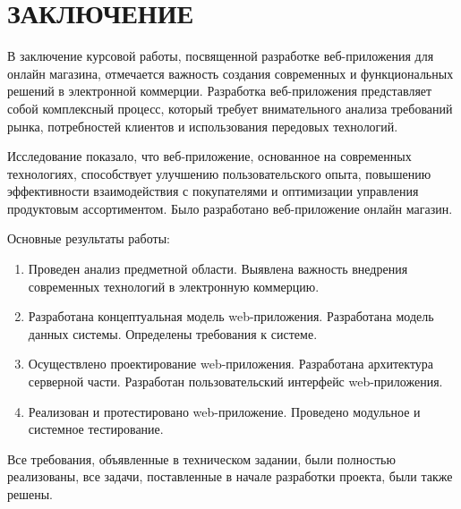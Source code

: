 \section*{ЗАКЛЮЧЕНИЕ}

В заключение курсовой работы, посвященной разработке веб-приложения для онлайн магазина, отмечается важность создания современных и функциональных решений в электронной коммерции. Разработка веб-приложения представляет собой комплексный процесс, который требует внимательного анализа требований рынка, потребностей клиентов и использования передовых технологий.
  
Исследование показало, что веб-приложение, основанное на современных технологиях, способствует улучшению пользовательского опыта, повышению эффективности взаимодействия с покупателями и оптимизации управления продуктовым ассортиментом.
Было разработано веб-приложение онлайн магазин.

Основные результаты работы:

\begin{enumerate}
\item Проведен анализ предметной области. Выявлена важность внедрения современных технологий в электронную коммерцию.
\item Разработана концептуальная модель web-приложения. Разработана модель данных системы. Определены требования к системе.
\item Осуществлено проектирование web-приложения. Разработана архитектура серверной части. Разработан пользовательский интерфейс web-приложения.
\item Реализован и протестировано web-приложение. Проведено модульное и системное тестирование.
\end{enumerate}

Все требования, объявленные в техническом задании, были полностью реализованы, все задачи, поставленные в начале разработки проекта, были также решены.


